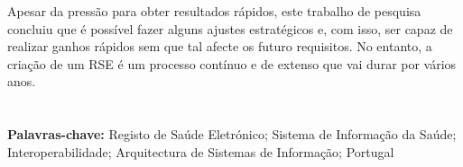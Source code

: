Apesar da pressão para obter resultados rápidos, este trabalho de pesquisa concluiu que é possível fazer alguns ajustes estratégicos e, com isso, ser capaz de realizar ganhos rápidos sem que tal afecte os futuro requisitos. No entanto, a criação de um RSE é um processo contínuo e de extenso que vai durar por vários anos.




\section*{}
\textbf{Palavras-chave:} Registo de Saúde Eletrónico; Sistema de Informação da Saúde; Interoperabilidade; Arquitectura de Sistemas de Informação; Portugal

%
